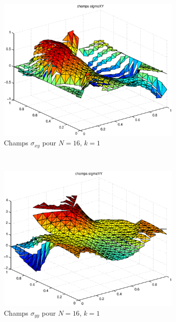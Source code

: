 \begin{figure}[h!]
\begin{subfigure}[b]{0.32\textwidth}
  \includegraphics[width=\textwidth]{images/sigmaxyN32.eps}
  \caption{Champs $\sigma_{xy}$ pour $N=16$, $k=1$}
  \end{subfigure}
  ~
  \begin{subfigure}[b]{0.32\textwidth}
  \includegraphics[width=\textwidth]{images/sigmayyN32.eps}
  \caption{Champs $\sigma_{yy}$ pour $N=16$, $k=1$}
  \end{subfigure}
  \begin{subfigure}[b]{0.32\textwidth}

\end{subfigure}
\end{figure}
